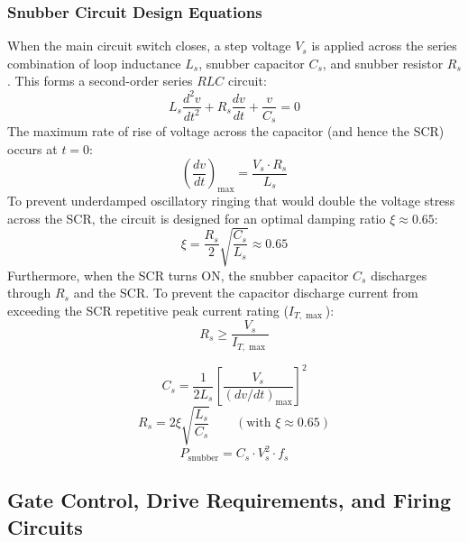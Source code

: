 \documentclass[11pt,a4paper]{article}
\begin{document}
\subsubsection{Snubber Circuit Design Equations}
When the main circuit switch closes, a step voltage $V_s$ is applied across the series combination of loop inductance $L_s$, snubber capacitor $C_s$, and snubber resistor $R_s$. This forms a second-order series $RLC$ circuit:
\begin{equation}
L_s \frac{d^2 v}{dt^2} + R_s \frac{dv}{dt} + \frac{v}{C_s} = 0
\end{equation}
The maximum rate of rise of voltage across the capacitor (and hence the SCR) occurs at $t = 0$:
\begin{equation}
\left(\frac{dv}{dt}\right)_{\max} = \frac{V_s \cdot R_s}{L_s}
\end{equation}
To prevent underdamped oscillatory ringing that would double the voltage stress across the SCR, the circuit is designed for an optimal damping ratio $\xi \approx 0.65$:
\begin{equation}
\xi = \frac{R_s}{2} \sqrt{\frac{C_s}{L_s}} \approx 0.65
\end{equation}
Furthermore, when the SCR turns ON, the snubber capacitor $C_s$ discharges through $R_s$ and the SCR. To prevent the capacitor discharge current from exceeding the SCR repetitive peak current rating ($I_{T,\max}$):
\begin{equation}
R_s \ge \frac{V_s}{I_{T,\max}}
\end{equation}

\begin{formulabox}
\begin{equation}
C_s = \frac{1}{2 L_s} \left[\frac{V_s}{(dv/dt)_{\max}}\right]^2
\end{equation}
\begin{equation}
R_s = 2 \xi \sqrt{\frac{L_s}{C_s}} \qquad (\text{with } \xi \approx 0.65)
\end{equation}
\begin{equation}
P_{\text{snubber}} = C_s \cdot V_s^2 \cdot f_s
\end{equation}
\end{formulabox}


\subsection{Gate Control, Drive Requirements, and Firing Circuits}
\end{document}
